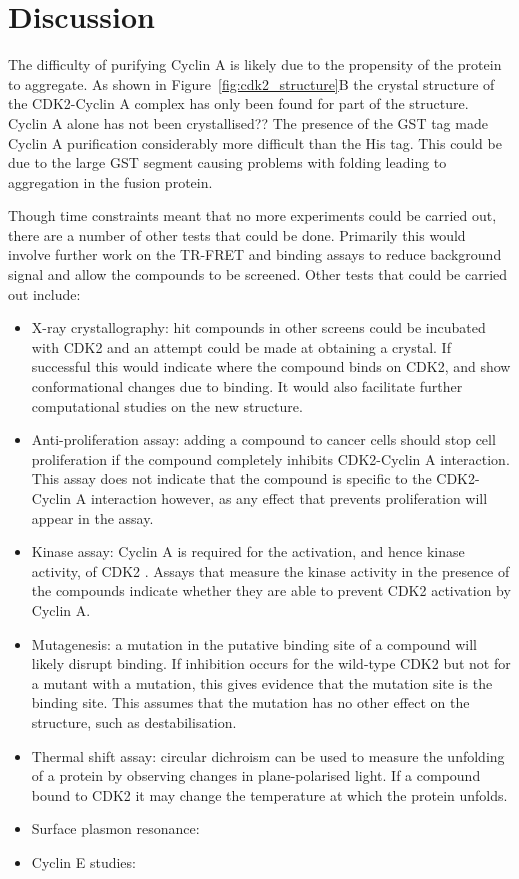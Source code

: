 \section{Discussion}

The difficulty of purifying Cyclin A is likely due to the propensity of the protein to aggregate.
As shown in Figure~\ref{fig:cdk2_structure}B the crystal structure of the CDK2-Cyclin A complex has only been found for part of the structure.
Cyclin A alone has not been crystallised??
The presence of the GST tag made Cyclin A purification considerably more difficult than the His tag.
This could be due to the large GST segment causing problems with folding leading to aggregation in the fusion protein.

Though time constraints meant that no more experiments could be carried out, there are a number of other tests that could be done.
Primarily this would involve further work on the TR-FRET and binding assays to reduce background signal and allow the compounds to be screened.
Other tests that could be carried out include:

\begin{itemize}
\item X-ray crystallography: hit compounds in other screens could be incubated with CDK2 and an attempt could be made at obtaining a crystal.
If successful this would indicate where the compound binds on CDK2, and show conformational changes due to binding.
It would also facilitate further computational studies on the new structure.
\item Anti-proliferation assay: adding a compound to cancer cells should stop cell proliferation if the compound completely inhibits CDK2-Cyclin A interaction.
This assay does not indicate that the compound is specific to the CDK2-Cyclin A interaction however, as any effect that prevents proliferation will appear in the assay.
\item Kinase assay: Cyclin A is required for the activation, and hence kinase activity, of CDK2 \cite{Jeffrey1995}.
Assays that measure the kinase activity in the presence of the compounds indicate whether they are able to prevent CDK2 activation by Cyclin A.
\item Mutagenesis: a mutation in the putative binding site of a compound will likely disrupt binding.
If inhibition occurs for the wild-type CDK2 but not for a mutant with a mutation, this gives evidence that the mutation site is the binding site.
This assumes that the mutation has no other effect on the structure, such as destabilisation.
\item Thermal shift assay: circular dichroism can be used to measure the unfolding of a protein by observing changes in plane-polarised light. %
If a compound bound to CDK2 it may change the temperature at which the protein unfolds.
\item Surface plasmon resonance:
\item Cyclin E studies: \cite{}
\end{itemize}
